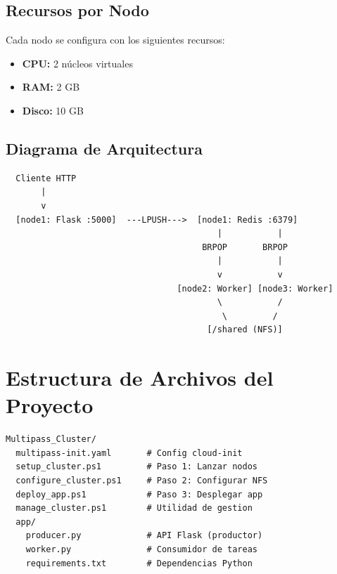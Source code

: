 \documentclass[12pt,a4paper]{article}
\begin{document}
\subsection{Recursos por Nodo}

Cada nodo se configura con los siguientes recursos:
\begin{itemize}
    \item \textbf{CPU:} 2 núcleos virtuales
    \item \textbf{RAM:} 2 GB
    \item \textbf{Disco:} 10 GB
\end{itemize}

\subsection{Diagrama de Arquitectura}

\begin{tcolorbox}[colback=codebg, colframe=codegray, title=Flujo de Procesamiento Distribuido]
\begin{verbatim}
  Cliente HTTP
       |
       v
  [node1: Flask :5000]  ---LPUSH--->  [node1: Redis :6379]
                                          |           |
                                       BRPOP       BRPOP
                                          |           |
                                          v           v
                                  [node2: Worker] [node3: Worker]
                                          \           /
                                           \         /
                                        [/shared (NFS)]
\end{verbatim}
\end{tcolorbox}

\section{Estructura de Archivos del Proyecto}

\begin{lstlisting}[language={}, title=Estructura del directorio]
Multipass_Cluster/
  multipass-init.yaml       # Config cloud-init
  setup_cluster.ps1         # Paso 1: Lanzar nodos
  configure_cluster.ps1     # Paso 2: Configurar NFS
  deploy_app.ps1            # Paso 3: Desplegar app
  manage_cluster.ps1        # Utilidad de gestion
  app/
    producer.py             # API Flask (productor)
    worker.py               # Consumidor de tareas
    requirements.txt        # Dependencias Python
\end{lstlisting}
\end{document}
